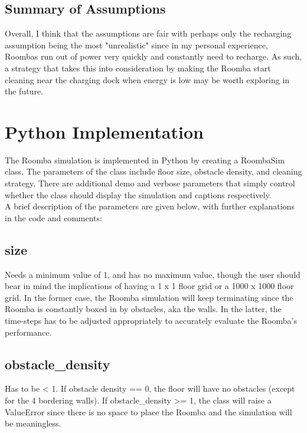 \documentclass[11pt]{article}
\begin{document}
\subsection{Summary of Assumptions}

Overall, I think that the assumptions are fair with perhaps only the
recharging assumption being the most "unrealistic" since in my personal
experience, Roombas run out of power very quickly and constantly need to
recharge. As such, a strategy that takes this into consideration by
making the Roomba start cleaning near the charging dock when energy is
low may be worth exploring in the future.

    \section{Python Implementation}

The Roomba simulation is implemented in Python by creating a RoombaSim
class. The parameters of the class include floor size, obstacle density,
and cleaning strategy. There are additional demo and verbose parameters
that simply control whether the class should display the simulation and
captions respectively.\\

A brief description of the parameters are given below, with further
explanations in the code and comments:

\subsection*{size}

Needs a minimum value of 1, and has no maximum value, though the user
should bear in mind the implications of having a 1 x 1 floor grid or a
1000 x 1000 floor grid. In the former case, the Roomba simulation will
keep terminating since the Roomba is constantly boxed in by obstacles,
aka the walls. In the latter, the time-steps has to be adjusted
appropriately to accurately evaluate the Roomba's performance.

\subsection*{obstacle\_density}

Has to be \textless{} 1. If obstacle density == 0, the floor will have
no obstacles (except for the 4 bordering walls). If obstacle\_density
\textgreater{}= 1, the class will raise a ValueError since there is no
space to place the Roomba and the simulation will be meaningless.
\end{document}
